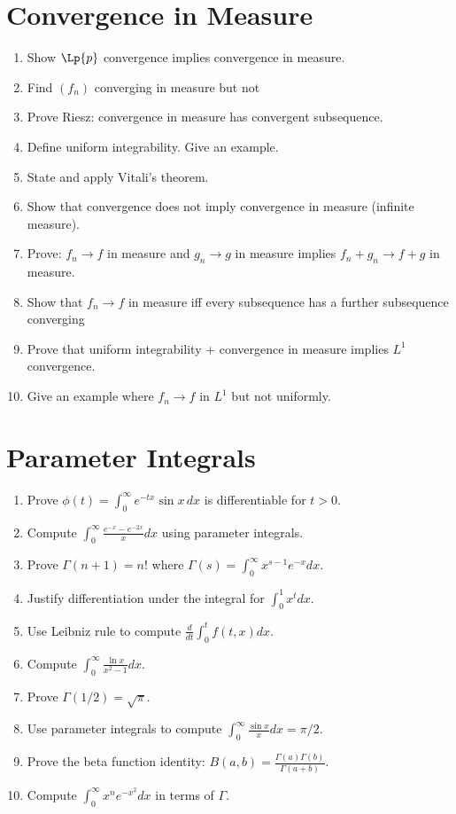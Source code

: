 \section{Convergence in Measure}

\begin{enumerate}
    \item Show $\Lp{p}$ convergence implies convergence in measure.
    \item Find $(f_n)$ converging in measure but not \almosteverywhere{}
    \item Prove Riesz: convergence in measure has \almosteverywhere{} convergent subsequence.
    \item Define uniform integrability. Give an example.
    \item State and apply Vitali's theorem.
    \item Show that \almosteverywhere{} convergence does not imply convergence in measure (infinite measure).
    \item Prove: $f_n \to f$ in measure and $g_n \to g$ in measure implies $f_n + g_n \to f + g$ in measure.
    \item Show that $f_n \to f$ in measure iff every subsequence has a further subsequence converging \almosteverywhere{}
    \item Prove that uniform integrability + convergence in measure implies $L^1$ convergence.
    \item Give an example where $f_n \to f$ in $L^1$ but not uniformly.
\end{enumerate}

\section{Parameter Integrals}

\begin{enumerate}
    \item Prove $\phi(t) = \int_0^\infty e^{-tx} \sin x \, dx$ is differentiable for $t > 0$.
    \item Compute $\int_0^\infty \frac{e^{-x} - e^{-2x}}{x} dx$ using parameter integrals.
    \item Prove $\Gamma(n+1) = n!$ where $\Gamma(s) = \int_0^\infty x^{s-1} e^{-x} dx$.
    \item Justify differentiation under the integral for $\int_0^1 x^t dx$.
    \item Use Leibniz rule to compute $\frac{d}{dt} \int_0^t f(t, x) dx$.
    \item Compute $\int_0^\infty \frac{\ln x}{x^2 - 1} dx$.
    \item Prove $\Gamma(1/2) = \sqrt{\pi}$.
    \item Use parameter integrals to compute $\int_0^\infty \frac{\sin x}{x} dx = \pi/2$.
    \item Prove the beta function identity: $B(a,b) = \frac{\Gamma(a)\Gamma(b)}{\Gamma(a+b)}$.
    \item Compute $\int_0^\infty x^n e^{-x^2} dx$ in terms of $\Gamma$.
\end{enumerate}

